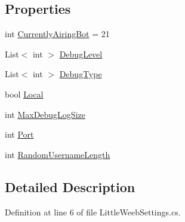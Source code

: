 \subsection*{Properties}
\begin{DoxyCompactItemize}
\item 
int \mbox{\hyperlink{class_little_weeb_library_1_1_settings_1_1_little_weeb_settings_a22bedc101a7007c6cdce341f22c833d6}{Currently\+Airing\+Bot}} = 21
\item 
List$<$ int $>$ \mbox{\hyperlink{class_little_weeb_library_1_1_settings_1_1_little_weeb_settings_a22ae8b2dc7e6bb5e0b3b0220484c4c86}{Debug\+Level}}
\item 
List$<$ int $>$ \mbox{\hyperlink{class_little_weeb_library_1_1_settings_1_1_little_weeb_settings_a3e498a95757f135bc082566afbfa8877}{Debug\+Type}}
\item 
bool \mbox{\hyperlink{class_little_weeb_library_1_1_settings_1_1_little_weeb_settings_a01ccf2dfb1b01854f23b34f1eb7ac39c}{Local}}
\item 
int \mbox{\hyperlink{class_little_weeb_library_1_1_settings_1_1_little_weeb_settings_aed66354aaf455ab77c7360074cb05a2d}{Max\+Debug\+Log\+Size}}
\item 
int \mbox{\hyperlink{class_little_weeb_library_1_1_settings_1_1_little_weeb_settings_ab37db9696fb199dbdad39ea6c7eda76c}{Port}}
\item 
int \mbox{\hyperlink{class_little_weeb_library_1_1_settings_1_1_little_weeb_settings_a0826aad7341af901477ce991359129d4}{Random\+Username\+Length}}
\end{DoxyCompactItemize}


\subsection{Detailed Description}


Definition at line 6 of file Little\+Weeb\+Settings.\+cs.



